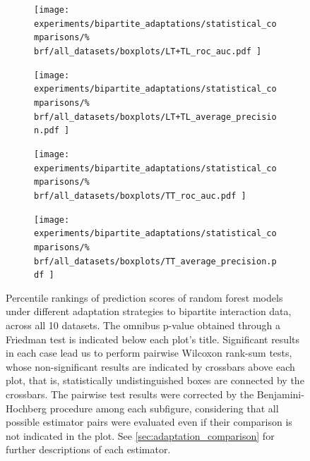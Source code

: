 
\begin{figure}[tbh]
    \centering
    \begin{subfigure}{0.49\textwidth}
        \texttt{[image: 
            experiments/bipartite\_adaptations/statistical\_comparisons/\%
            brf/all\_datasets/boxplots/LT+TL\_roc\_auc.pdf
        ]}
    \end{subfigure}
    \begin{subfigure}{0.49\textwidth}
        \texttt{[image: 
            experiments/bipartite\_adaptations/statistical\_comparisons/\%
            brf/all\_datasets/boxplots/LT+TL\_average\_precision.pdf
        ]}
    \end{subfigure}

    \begin{subfigure}{0.49\textwidth}
        \texttt{[image: 
            experiments/bipartite\_adaptations/statistical\_comparisons/\%
            brf/all\_datasets/boxplots/TT\_roc\_auc.pdf
        ]}
    \end{subfigure}
    \begin{subfigure}{0.49\textwidth}
        \texttt{[image: 
            experiments/bipartite\_adaptations/statistical\_comparisons/\%
            brf/all\_datasets/boxplots/TT\_average\_precision.pdf
        ]}
    \end{subfigure}
    \caption{
        Percentile rankings of prediction scores of random forest models under different adaptation strategies to bipartite interaction data, across all 10 datasets.
        The omnibus p-value obtained through a Friedman test is indicated below each plot's title. Significant results in each case lead us to perform pairwise Wilcoxon rank-sum tests, whose non-significant results are indicated by crossbars above each plot, that is, statistically undistinguished boxes are connected by the crossbars. The pairwise test results were corrected by the Benjamini-Hochberg procedure among each subfigure, considering that all possible estimator pairs were evaluated even if their comparison is not indicated in the plot. See \autoref{sec:adaptation_comparison} for further descriptions of each estimator.
    }
    \label{fig:adaptations_brf}
\end{figure}


